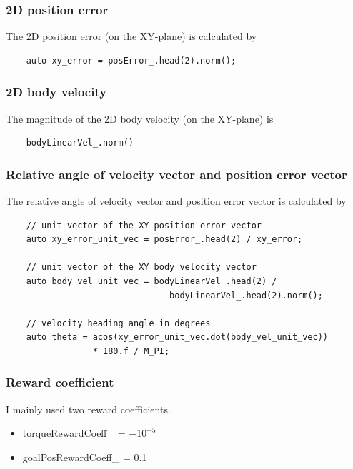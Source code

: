 \documentclass{article}
\begin{document}
    \subsubsection{2D position error}
    \label{subsec:xy_err}
    
    The 2D position error (on the XY-plane) is calculated by 

    \begin{verbatim}
    auto xy_error = posError_.head(2).norm();
    \end{verbatim}

    \subsubsection{2D body velocity}
    \label{subsec:2D_vel}
    The magnitude of the 2D body velocity (on the XY-plane) is

    \begin{verbatim}
    bodyLinearVel_.norm()
    \end{verbatim}

    \subsubsection{Relative angle of velocity vector and position error vector}
    \label{subsec:relative_angle}
    The relative angle of velocity vector and position error vector is calculated by

    \begin{verbatim}
    // unit vector of the XY position error vector
    auto xy_error_unit_vec = posError_.head(2) / xy_error;

    // unit vector of the XY body velocity vector
    auto body_vel_unit_vec = bodyLinearVel_.head(2) / 
                                bodyLinearVel_.head(2).norm();

    // velocity heading angle in degrees
    auto theta = acos(xy_error_unit_vec.dot(body_vel_unit_vec)) 
                 * 180.f / M_PI; 
    \end{verbatim}

    \subsubsection{Reward coefficient}
        I mainly used two reward coefficients.
        \begin{itemize}
            \item torqueRewardCoeff\_ = $-10^{-5}$
            \item goalPosRewardCoeff\_ = 0.1
        \end{itemize}
\end{document}
